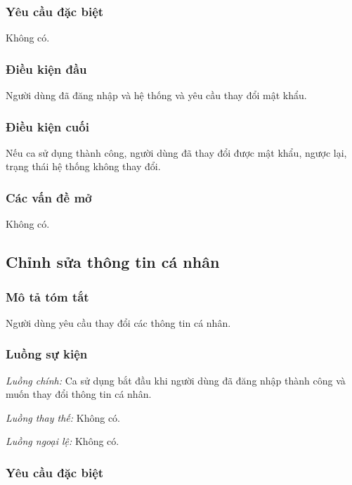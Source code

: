 \documentclass[./../main.tex]{subfiles}
\begin{document}
\subsubsection*{Yêu cầu đặc biệt}

Không có.

\subsubsection*{Điều kiện đầu}

Người dùng đã đăng nhập và hệ thống và yêu cầu thay đổi mật khẩu.

\subsubsection*{Điều kiện cuối}

Nếu ca sử dụng thành công, người dùng đã thay đổi được mật khẩu, ngược
lại, trạng thái hệ thống không thay đổi.

\subsubsection*{Các vấn đề mở}

Không có.

\subsection{Chỉnh sửa thông tin cá nhân}

\subsubsection*{Mô tả tóm tắt}

Người dùng yêu cầu thay đổi các thông tin cá nhân.

\subsubsection*{Luồng sự kiện}

\emph{Luồng chính:} Ca sử dụng bắt đầu khi người dùng đã đăng nhập thành
công và muốn thay đổi thông tin cá nhân.

\emph{Luồng thay thế:} Không có.

\emph{Luồng ngoại lệ:} Không có.

\subsubsection*{Yêu cầu đặc biệt}
\end{document}
